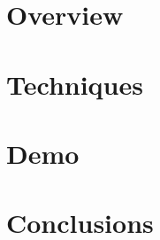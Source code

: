 \section[Overview]{Overview}


\section[Techniques]{Techniques}


\section[Demo]{Demo}


\section[Concl]{Conclusions}
